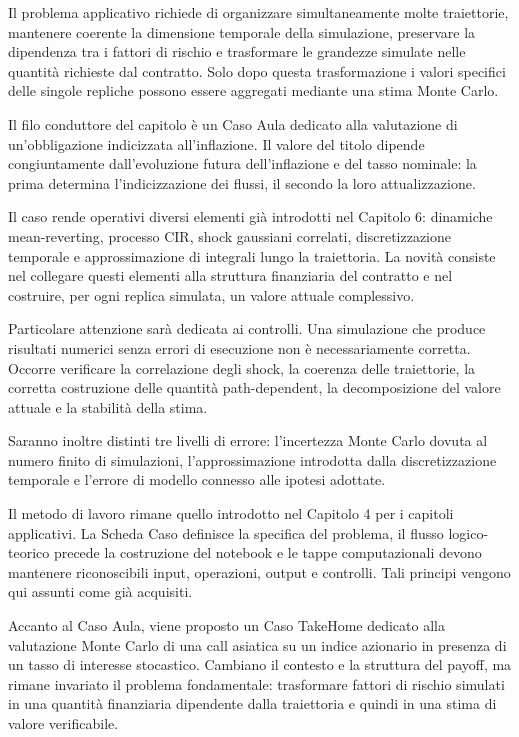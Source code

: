 Il problema applicativo richiede di organizzare simultaneamente molte
traiettorie, mantenere coerente la dimensione temporale della simulazione,
preservare la dipendenza tra i fattori di rischio e trasformare le
grandezze simulate nelle quantit\`a richieste dal contratto. Solo dopo
questa trasformazione i valori specifici delle singole repliche possono essere
aggregati mediante una stima Monte Carlo.

Il filo conduttore del capitolo \`e un Caso Aula dedicato alla valutazione
di un'obbligazione indicizzata all'inflazione. Il valore del titolo dipende
congiuntamente dall'evoluzione futura dell'inflazione e del tasso nominale:
la prima determina l'indicizzazione dei flussi, il secondo la loro
attualizzazione.

Il caso rende operativi diversi elementi gi\`a introdotti nel Capitolo 6:
dinamiche mean-reverting, processo CIR, shock gaussiani correlati,
discretizzazione temporale e approssimazione di integrali lungo la
traiettoria. La novit\`a consiste nel collegare questi elementi alla
struttura finanziaria del contratto e nel costruire, per ogni replica simulata,
un valore attuale complessivo.

Particolare attenzione sar\`a dedicata ai controlli. Una simulazione che
produce risultati numerici senza errori di esecuzione non \`e
necessariamente corretta. Occorre verificare la correlazione degli shock,
la coerenza delle traiettorie, la corretta costruzione delle quantit\`a
path-dependent, la decomposizione del valore attuale e la stabilit\`a
della stima.

Saranno inoltre distinti tre livelli di errore: l'incertezza Monte Carlo
dovuta al numero finito di simulazioni, l'approssimazione introdotta dalla
discretizzazione temporale e l'errore di modello connesso alle ipotesi
adottate.

Il metodo di lavoro rimane quello introdotto nel Capitolo 4 per i
capitoli applicativi. La Scheda Caso definisce la specifica del problema,
il flusso logico-teorico precede la costruzione del notebook e le tappe
computazionali devono mantenere riconoscibili input, operazioni, output e
controlli. Tali principi vengono qui assunti come gi\`a acquisiti.

Accanto al Caso Aula, viene proposto un Caso TakeHome dedicato alla
valutazione Monte Carlo di una call asiatica su un indice azionario in
presenza di un tasso di interesse stocastico. Cambiano il contesto e la
struttura del payoff, ma rimane invariato il problema fondamentale:
trasformare fattori di rischio simulati in una quantit\`a finanziaria
dipendente dalla traiettoria e quindi in una stima di valore verificabile.

